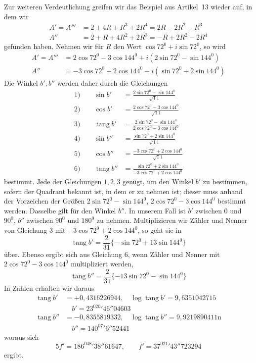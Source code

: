 \clearpage
\hypertarget{native-270-pure17}{}\label{native-270-pure17}
Zur weiteren Verdeutlichung greifen wir das Beispiel aus Artikel~13 wieder auf, in dem wir
\[
\begin{aligned}
A'=A'''&=2+4R+R^3+2R^4=2R-2R^2-R^3\\
A''&=2+R+4R^2+2R^3=-R+2R^2-2R^4
\end{aligned}
\]
gefunden haben. Nehmen wir für $R$ den Wert $\cos72^0+i\sin72^0$, so wird
\[
\begin{aligned}
A'=A'''&=2\cos72^0-3\cos144^0+i(2\sin72^0-\sin144^0)\\
A''&=-3\cos72^0+2\cos144^0+i(\sin72^0+2\sin144^0)
\end{aligned}
\]
Die Winkel $b',b''$ werden daher durch die Gleichungen
\[
\begin{aligned}
1)\qquad\sin b'&=\frac{2\sin72^0-\sin144^0}{\surd11}\\
2)\qquad\cos b'&=\frac{2\cos72^0-3\cos144^0}{\surd11}\\
3)\qquad\operatorname{tang}b'&=\frac{2\sin72^0-\sin144^0}{2\cos72^0-3\cos144^0}\\
4)\qquad\sin b''&=\frac{\sin72^0+2\sin144^0}{\surd11}\\
5)\qquad\cos b''&=\frac{-3\cos72^0+2\cos144^0}{\surd11}\\
6)\qquad\operatorname{tang}b''&=\frac{\sin72^0+2\sin144^0}{-3\cos72^0+2\cos144^0}
\end{aligned}
\]
bestimmt. Jede der Gleichungen $1,2,3$ genügt, um den Winkel $b'$ zu bestimmen, sofern der Quadrant bekannt ist, in dem er zu nehmen ist; dieser muss anhand der Vorzeichen der Größen $2\sin72^0-\sin144^0$, $2\cos72^0-3\cos144^0$ bestimmt werden. Dasselbe gilt für den Winkel $b''$. In unserem Fall ist $b'$ zwischen $0$ und $90^0$, $b''$ zwischen $90^0$ und $180^0$ zu nehmen. Multiplizieren wir Zähler und Nenner von Gleichung $3$ mit $-3\cos72^0+2\cos144^0$, so geht sie in
\[
\operatorname{tang}b'=\frac2{31}\{-\sin72^0+13\sin144^0\}
\]
über. Ebenso ergibt sich aus Gleichung $6$, wenn Zähler und Nenner mit $2\cos72^0-3\cos144^0$ multipliziert werden,
\[
\operatorname{tang}b''=\frac2{31}\{-13\sin72^0-\sin144^0\}
\]
In Zahlen erhalten wir daraus
\[
\begin{aligned}
\operatorname{tang}b'&=+0{,}4316226944,\quad\log\operatorname{tang}b'=9{,}6351042715\\
&\hspace{1em}b'=23^020'46''04603\\
\operatorname{tang}b''&=-0{,}8355819332,\quad\log\operatorname{tang}b''=9{,}9219890411\mathrm n\\
&\hspace{1em}b''=140^07'6''52441
\end{aligned}
\]
woraus sich
\[
5f'=186^048'38''61647,\qquad f'=37^021'43''723294
\]
ergibt.

